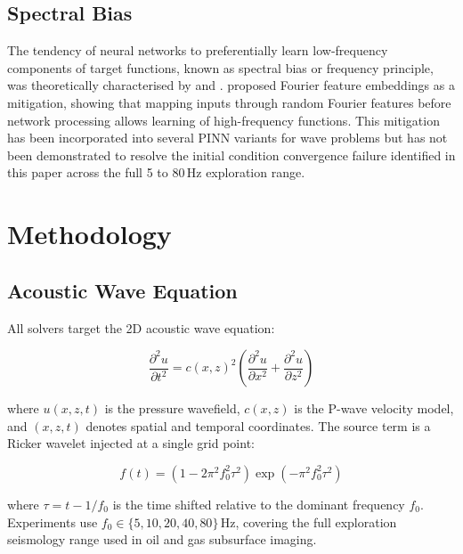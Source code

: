 \documentclass[12pt,a4paper]{article}
\begin{document}
\subsection{Spectral Bias}

The tendency of neural networks to preferentially learn
low-frequency components of target functions, known as spectral
bias or frequency principle, was theoretically characterised by
\citet{rahaman2019} and \citet{tancik2020}. \citet{tancik2020}
proposed Fourier feature embeddings as a mitigation, showing that
mapping inputs through random Fourier features before network
processing allows learning of high-frequency functions. This
mitigation has been incorporated into several PINN variants for
wave problems but has not been demonstrated to resolve the
initial condition convergence failure identified in this paper
across the full 5 to 80\,Hz exploration range.

\section{Methodology}
\label{sec:method}

\subsection{Acoustic Wave Equation}

All solvers target the 2D acoustic wave equation:

\begin{equation}
\frac{\partial^2 u}{\partial t^2} = c(x,z)^2
\left(\frac{\partial^2 u}{\partial x^2} +
\frac{\partial^2 u}{\partial z^2}\right)
\label{eq:wave}
\end{equation}

where $u(x,z,t)$ is the pressure wavefield, $c(x,z)$ is the
P-wave velocity model, and $(x,z,t)$ denotes spatial and temporal
coordinates. The source term is a Ricker wavelet injected at a
single grid point:

\begin{equation}
f(t) = \left(1 - 2\pi^2 f_0^2 \tau^2\right)
\exp\left(-\pi^2 f_0^2 \tau^2\right)
\label{eq:ricker}
\end{equation}

where $\tau = t - 1/f_0$ is the time shifted relative to the
dominant frequency $f_0$. Experiments use $f_0 \in \{5, 10, 20,
40, 80\}$\,Hz, covering the full exploration seismology range
used in oil and gas subsurface imaging.
\end{document}
